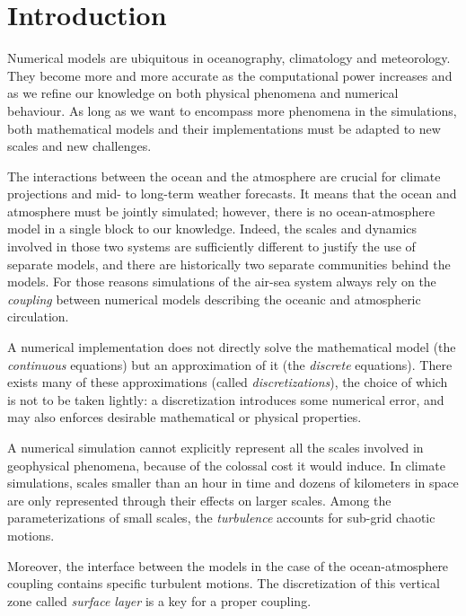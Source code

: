 
\chapter*{Introduction}
\label{ch:introduction}
Numerical models are ubiquitous in oceanography, climatology and
meteorology. They become more and more accurate as the
computational power increases and as we refine our knowledge on
both physical phenomena and numerical behaviour.
As long as we want to encompass more phenomena in the simulations,
both mathematical models and their implementations must be
adapted to new scales and new challenges.
\par %
The interactions between the ocean and the atmosphere are crucial
for climate projections and mid- to long-term weather forecasts.
It means that the ocean and atmosphere must be jointly simulated;
however, there is no ocean-atmosphere model in a single
block to our knowledge.
Indeed, the scales and dynamics involved in those two systems are
sufficiently different to justify the use of separate models,
and there are historically two separate communities behind the
models. For those reasons simulations of the air-sea system
always rely on the \textit{coupling} between numerical models describing
the oceanic and atmospheric circulation.
\par %
A numerical implementation does not directly solve the mathematical
model (the \textit{continuous} equations) but an approximation of it
(the \textit{discrete} equations). There exists many of these
approximations (called \textit{discretizations}), the choice of which
is not to be taken lightly: a discretization introduces some
numerical error, and may also enforces desirable mathematical
or physical properties.
\par
A numerical simulation cannot explicitly represent all the
scales involved in geophysical phenomena, because of the
colossal cost it would induce. In climate simulations,
scales smaller than an hour in time
and dozens of kilometers in space are only represented
through their effects on larger scales.
Among the parameterizations of small scales, the \textit{turbulence}
accounts for sub-grid chaotic motions.
\par %
Moreover, the interface between the models in the case of
the ocean-atmosphere coupling contains
specific turbulent motions. The discretization of this vertical zone
called \textit{surface layer} is a key for a proper coupling.
